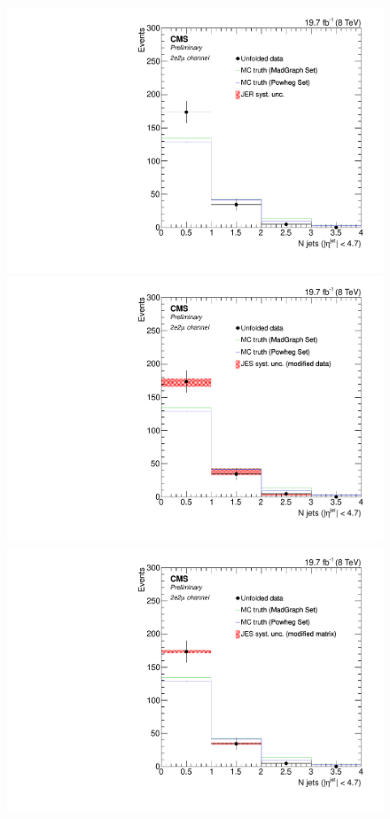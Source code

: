 \begin{figure}[hbtp]
\begin{center}
    \includegraphics[width=0.8\cmsFigWidth]{Figures/Unfolding/Systematics/ZZTo2e2m_Jets_JER_Mad_fr}
    \includegraphics[width=0.8\cmsFigWidth]{Figures/Unfolding/Systematics/ZZTo2e2m_Jets_JES_ModData_Mad_fr}     
    \includegraphics[width=0.8\cmsFigWidth]{Figures/Unfolding/Systematics/ZZTo2e2m_Jets_JES_ModMat_Mad_fr}

\end{center}
\end{figure}
